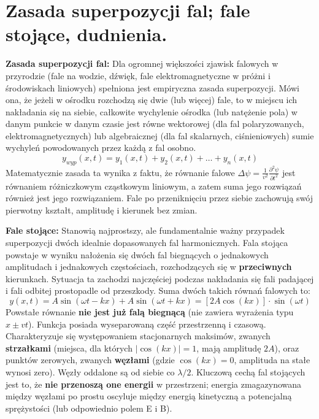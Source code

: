 \documentclass[11pt, a4paper]{article}
\begin{document}
\section{Zasada superpozycji fal; fale stojące, dudnienia.}

\textbf{Zasada superpozycji fal:}
Dla ogromnej większości zjawisk falowych w przyrodzie (fale na wodzie, dźwięk, fale elektromagnetyczne w próżni i środowiskach liniowych) spełniona jest empiryczna zasada superpozycji. Mówi ona, że jeżeli w ośrodku rozchodzą się dwie (lub więcej) fale, to w miejscu ich nakładania się na siebie, całkowite wychylenie ośrodka (lub natężenie pola) w danym punkcie w danym czasie jest równe wektorowej (dla fal polaryzowanych, elektromagnetycznych) lub algebraicznej (dla fal skalarnych, ciśnieniowych) sumie wychyleń powodowanych przez każdą z fal osobno.
\[
y_{wyp}(x,t) = y_1(x,t) + y_2(x,t) + \dots + y_n(x,t)
\]
Matematycznie zasada ta wynika z faktu, że równanie falowe $\Delta \psi = \frac{1}{v^2} \frac{\partial^2 \psi}{\partial t^2}$ jest równaniem różniczkowym cząstkowym liniowym, a zatem suma jego rozwiązań również jest jego rozwiązaniem. Fale po przeniknięciu przez siebie zachowują swój pierwotny kształt, amplitudę i kierunek bez zmian.

\textbf{Fale stojące:}
Stanowią najprostszy, ale fundamentalnie ważny przypadek superpozycji dwóch idealnie dopasowanych fal harmonicznych. Fala stojąca powstaje w wyniku nałożenia się dwóch fal biegnących o jednakowych amplitudach i jednakowych częstościach, rozchodzących się w \textbf{przeciwnych} kierunkach. Sytuacja ta zachodzi najczęściej podczas nakładania się fali padającej i fali odbitej prostopadle od przeszkody. Suma dwóch takich równań falowych to:
\[
y(x,t) = A\sin(\omega t - kx) + A\sin(\omega t + kx) = [2A\cos(kx)] \cdot \sin(\omega t)
\]
Powstałe równanie \textbf{nie jest już falą biegnącą} (nie zawiera wyrażenia typu $x \pm vt$). Funkcja posiada wyseparowaną część przestrzenną i czasową. Charakteryzuje się występowaniem stacjonarnych maksimów, zwanych \textbf{strzałkami} (miejsca, dla których $|\cos(kx)| = 1$, mają amplitudę $2A$), oraz punktów zerowych, zwanych \textbf{węzłami} (gdzie $\cos(kx) = 0$, amplituda na stałe wynosi zero). Węzły oddalone są od siebie co $\lambda/2$. Kluczową cechą fal stojących jest to, że \textbf{nie przenoszą one energii} w przestrzeni; energia zmagazynowana między węzłami po prostu oscyluje między energią kinetyczną a potencjalną sprężystości (lub odpowiednio polem E i B).
\end{document}
